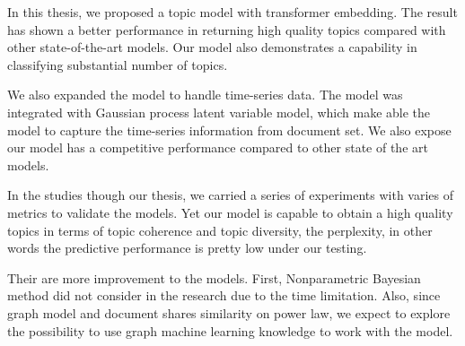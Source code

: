 In this thesis, we proposed a topic model with transformer embedding. The result has shown a better performance in returning high quality topics compared with other state-of-the-art models. Our model also demonstrates a capability in classifying substantial number of topics.

We also expanded the model to handle time-series data. The model was integrated with Gaussian process latent variable model, which make able the model to capture the time-series information from document set. We also expose our model has a competitive performance compared to other state of the art models.

In the studies though our thesis, we carried a series of experiments with varies of metrics to validate the models. Yet our model is capable to obtain a high quality topics in terms of topic coherence and topic diversity, the perplexity, in other words the predictive performance is pretty low under our testing.

Their are more improvement to the models. First, Nonparametric Bayesian method did not consider in the research due to the time limitation. Also, since graph model and document shares similarity on power law, we expect to explore the possibility to use graph machine learning knowledge to work with the model.